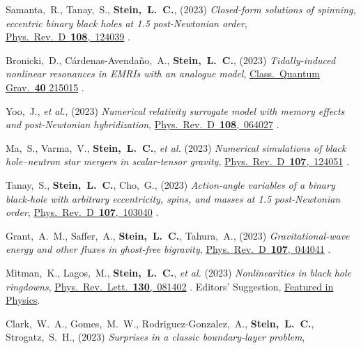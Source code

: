 \begin{etaremune}[start=\value{pubCounter}]
\item
  Samanta,~R.,
  Tanay,~S.,
  {\bf Stein,~L.~C.},
  (2023)
  {\it Closed-form solutions of spinning, eccentric binary black holes at 1.5 post-Newtonian order},
  \href{https://doi.org/10.1103/PhysRevD.108.124039}%
  {Phys.~Rev.~D~{\bf 108},~124039}
  .
\item
  Bronicki,~D.,
  Cárdenas-Avendaño,~A.,
  {\bf Stein,~L.~C.},
  (2023)
  {\it Tidally-induced nonlinear resonances in EMRIs with an analogue model},
  \href{https://doi.org/10.1088/1361-6382/acfcfe}%
  {Class.~Quantum Grav.~{\bf 40} 215015}
  .
\item
  Yoo,~J., {\it et al.},
  (2023)
  {\it Numerical relativity surrogate model with memory effects and post-Newtonian hybridization},
  \href{https://doi.org/10.1103/PhysRevD.108.064027}%
  {Phys.~Rev.~D~{\bf 108},~064027}
  .
\item
  Ma,~S.,
  Varma,~V.,
  {\bf Stein,~L.~C.},
  {\it et al.}
  (2023)
  {\it Numerical simulations of black hole--neutron star mergers in scalar-tensor gravity},
  \href{https://doi.org/10.1103/PhysRevD.107.124051}%
  {Phys.~Rev.~D~{\bf 107},~124051}
  .
\item
  Tanay,~S.,
  {\bf Stein,~L.~C.},
  Cho,~G.,
  (2023)
  {\it Action-angle variables of a binary black-hole with arbitrary eccentricity, spins, and masses at 1.5 post-Newtonian order},
  \href{https://doi.org/10.1103/PhysRevD.107.103040}%
  {Phys.~Rev.~D~{\bf 107},~103040}
  .
\item
  Grant,~A.~M.,
  Saffer,~A.,
  {\bf Stein,~L.~C.},
  Tahura,~A.,
  (2023)
  {\it Gravitational-wave energy and other fluxes in ghost-free bigravity},
  \href{https://doi.org/10.1103/PhysRevD.107.044041}%
  {Phys.~Rev.~D~{\bf 107},~044041}
  .
\item
  Mitman,~K.,
  Lagos,~M.,
  {\bf Stein,~L.~C.},
  {\it et al.}
  (2023)
  {\it Nonlinearities in black hole ringdowns},
  \href{https://doi.org/10.1103/PhysRevLett.130.081402}{Phys.~Rev.~Lett.~{\bf 130},~081402}
  .
  \raisebox{.15em}{\aldine} Editors' Suggestion,
  \href{https://physics.aps.org/articles/v16/29}{Featured in Physics}.
\item
  Clark,~W.~A.,
  Gomes,~M.~W.,
  Rodriguez-Gonzalez,~A.,
  {\bf Stein,~L.~C.},
  Strogatz,~S.~H.,
  (2023)
  {\it Surprises in a classic boundary-layer problem},

\end{etaremune}
